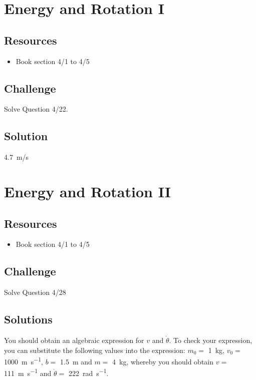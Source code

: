 \newpage
\section{Energy and Rotation I}

\subsection*{Resources}
\begin{itemize}
    \item Book section 4/1 to 4/5
\end{itemize}

\subsection*{Challenge}
Solve Question 4/22.

\subsection*{Solution}
\SI{4.7}{m/s}



\newpage
\section{Energy and Rotation II}

\subsection*{Resources}
\begin{itemize}
    \item Book section 4/1 to 4/5
\end{itemize}

\subsection*{Challenge}
Solve Question 4/28

\subsection*{Solutions}
You should obtain an algebraic expression for $v$ and $\dot{\theta}$. To check your expression, you can substitute the following values into the expression:
$m_0=$ \SI{1}{\kg},
$v_0=$ \SI{1000}{\meter\per\second},
$b=$ \SI{1.5}{\meter} and
$m=$ \SI{4}{\kg}, whereby you should obtain
$v=$ \SI{111}{\meter\per\second} and
$\dot{\theta}=$ \SI{222}{\radian\per\second}.





